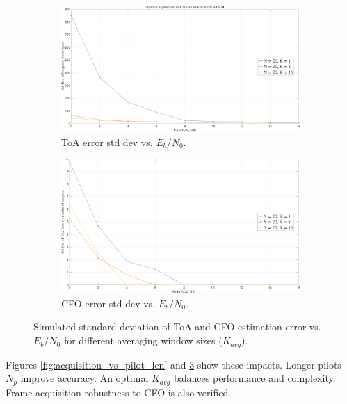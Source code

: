 \documentclass[11pt]{article}
\begin{document}
	\begin{figure}[H]
		\centering
		\begin{subfigure}[b]{0.48\textwidth}
			\centering
			\includegraphics[width=\linewidth]{Images/frame_sync_K_avg.png} 
			\caption{ToA error std dev vs. $E_b/N_0$.}
			\label{fig:frame_sync_K_avg_style_change}
		\end{subfigure}
		\hfill
		\begin{subfigure}[b]{0.48\textwidth}
			\centering
			\includegraphics[width=\linewidth]{Images/cfo_est_K_avg.png} 
			\caption{CFO error std dev vs. $E_b/N_0$.}
			\label{fig:cfo_est_K_avg_style_change}
		\end{subfigure}
		\caption{Simulated standard deviation of ToA and CFO estimation error vs. $E_b/N_0$ for different averaging window sizes ($K_{avg}$).}
		\label{fig:acquisition_vs_K_avg}
	\end{figure}
	
	Figures \ref{fig:acquisition_vs_pilot_len} and \ref{fig:acquisition_vs_K_avg} show these impacts. Longer pilots $N_p$ improve accuracy. An optimal $K_{avg}$ balances performance and complexity. Frame acquisition robustness to CFO is also verified.
	
\end{document}
